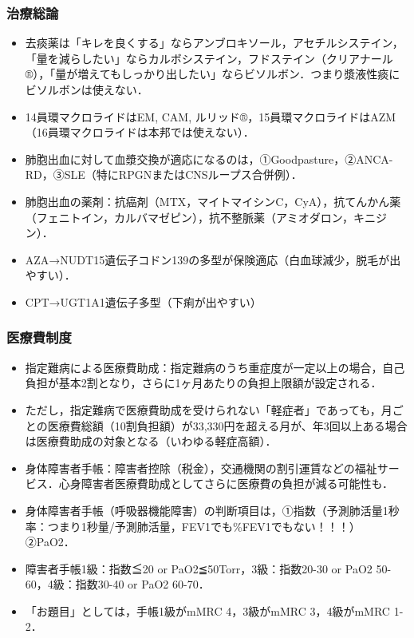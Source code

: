 \subsubsection{治療総論}

\begin{itemize}
\item 去痰薬は「キレを良くする」ならアンブロキソール，アセチルシステイン，「量を減らしたい」ならカルボシステイン，フドステイン（クリアナール®），「量が増えてもしっかり出したい」ならビソルボン．つまり漿液性痰にビソルボンは使えない．
\item 14員環マクロライドはEM, CAM, ルリッド®，15員環マクロライドはAZM（16員環マクロライドは本邦では使えない）．
\item 肺胞出血に対して血漿交換が適応になるのは，①Goodpasture，②ANCA-RD，③SLE（特にRPGNまたはCNSループス合併例）．
\item 肺胞出血の薬剤：抗癌剤（MTX，マイトマイシンC，CyA），抗てんかん薬（フェニトイン，カルバマゼピン），抗不整脈薬（アミオダロン，キニジン）．
\item AZA→NUDT15遺伝子コドン139の多型が保険適応（白血球減少，脱毛が出やすい）．
\item CPT→UGT1A1遺伝子多型（下痢が出やすい）
\end{itemize}


\subsubsection{医療費制度}

\begin{itemize}
\item 指定難病による医療費助成：指定難病のうち重症度が一定以上の場合，自己負担が基本2割となり，さらに1ヶ月あたりの負担上限額が設定される．
\item ただし，指定難病で医療費助成を受けられない「軽症者」であっても，月ごとの医療費総額（10割負担額）が33,330円を超える月が、年3回以上ある場合は医療費助成の対象となる（いわゆる軽症高額）．
\item 身体障害者手帳：障害者控除（税金），交通機関の割引運賃などの福祉サービス．心身障害者医療費助成としてさらに医療費の負担が減る可能性も．
\item 身体障害者手帳（呼吸器機能障害）の判断項目は，①指数（予測肺活量1秒率：つまり1秒量/予測肺活量，FEV1でも\%FEV1でもない！！！）②PaO2．
\item 障害者手帳1級：指数≦20 or PaO2≦50Torr，3級：指数20-30 or PaO2 50-60，4級：指数30-40 or PaO2 60-70．
\item 「お題目」としては，手帳1級がmMRC 4，3級がmMRC 3，4級がmMRC 1-2．
\end{itemize}

